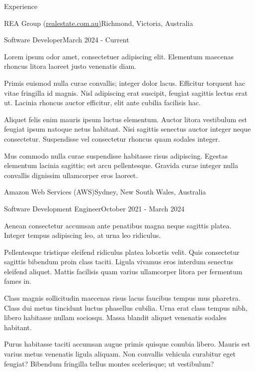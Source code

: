 \documentclass{cv}
\begin{document}
\begin{cvsection}{Experience}

\begin{cvheading}{REA Group (\href{https://realestate.com.au/}{realestate.com.au)}}{Richmond, Victoria, Australia}
\begin{cvsubheading}{Software Developer}{March 2024 - Current}
\item Lorem ipsum odor amet, consectetuer adipiscing elit. Elementum maecenas rhoncus litora laoreet justo venenatis diam.
\item Primis euismod nulla curae convallis; integer dolor lacus. Efficitur torquent hac vitae fringilla id magnis. Nisl adipiscing erat suscipit, feugiat sagittis lectus erat ut. Lacinia rhoncus auctor efficitur, elit ante cubilia facilisis hac.
\item Aliquet felis enim mauris ipsum luctus elementum. Auctor litora vestibulum est feugiat ipsum natoque netus habitant. Nisi sagittis senectus auctor integer neque consectetur. Suspendisse vel consectetur rhoncus quam sodales integer.
\item Mus commodo nulla curae suspendisse habitasse risus adipiscing. Egestas elementum lacinia sagittis; est arcu pellentesque. Gravida curae integer nulla convallis dignissim ullamcorper eros laoreet.
\end{cvsubheading}
\end{cvheading}

\begin{cvheading}{Amazon Web Services (AWS)}{Sydney, New South Wales, Australia}
\begin{cvsubheading}{Software Development Engineer}{October 2021 - March 2024}
\item Aenean consectetur accumsan ante penatibus magna neque sagittis platea. Integer tempus adipiscing leo, at urna leo ridiculus.
\item Pellentesque tristique eleifend ridiculus platea lobortis velit. Quis consectetur sagittis bibendum proin class taciti. Ligula vivamus eros interdum senectus eleifend aliquet. Mattis facilisis quam varius ullamcorper litora per fermentum fames in.
\item Class magnis sollicitudin maecenas risus lacus faucibus tempus mus pharetra. Class dui metus tincidunt luctus phasellus cubilia. Urna erat class tempus nibh, libero habitasse nullam sociosqu. Massa blandit aliquet venenatis sodales habitant.
\item Purus habitasse taciti accumsan augue primis quisque conubia libero. Mauris est varius metus venenatis ligula aliquam. Non convallis vehicula curabitur eget feugiat? Bibendum fringilla tellus montes scelerisque; ut vestibulum?
\end{cvsubheading}
\end{cvheading}


\end{cvsection}
\end{document}
